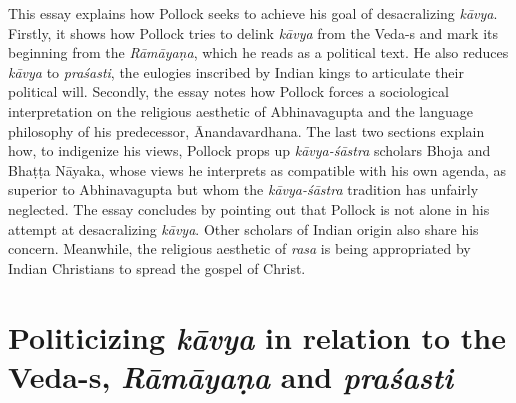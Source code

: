 This essay explains how Pollock seeks to achieve his goal of desacralizing \textsl{kāvya}. Firstly, it shows how Pollock tries to delink \textsl{kāvya} from the Veda-s and mark its beginning from the \textsl{Rāmāyaṇa}, which he reads as a political text. He also reduces \textsl{kāvya} to \textsl{praśasti}, the eulogies inscribed by Indian kings to articulate their political will. Secondly, the essay notes how Pollock forces a sociological interpretation on the religious aesthetic of Abhinavagupta and the language philosophy of his predecessor, Ānandavardhana. The last two sections explain how, to indigenize his views, Pollock props up \textsl{kāvya-śāstra} scholars Bhoja and Bhaṭṭa Nāyaka, whose views he interprets as compatible with his own agenda, as superior to Abhinavagupta but whom the \textsl{kāvya-śāstra} tradition has unfairly neglected. The essay concludes by pointing out that Pollock is not alone in his attempt at desacralizing \textsl{kāvya}. Other scholars of Indian origin also share his concern. Meanwhile, the religious aesthetic of \textsl{rasa} is being appropriated by Indian Christians to spread the gospel of Christ.

\section*{Politicizing {\sl\bfseries kāvya} in relation to the Veda-s, {\sl\bfseries Rāmāyaṇa} and {\sl\bfseries praśasti}}

